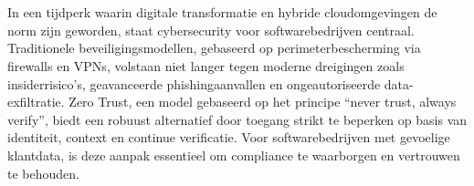
\chapter{}%
\label{ch:inleiding}



In een tijdperk waarin digitale transformatie en hybride cloudomgevingen de norm zijn geworden, staat cybersecurity voor softwarebedrijven centraal. Traditionele beveiligingsmodellen, gebaseerd op perimeterbescherming via firewalls en VPNs, volstaan niet langer tegen moderne dreigingen zoals insiderrisico’s, geavanceerde phishingaanvallen en ongeautoriseerde data-exfiltratie. Zero Trust, een model gebaseerd op het principe “never trust, always verify”, biedt een robuust alternatief door toegang strikt te beperken op basis van identiteit, context en continue verificatie. Voor softwarebedrijven met gevoelige klantdata, is deze aanpak essentieel om compliance te waarborgen en vertrouwen te behouden.

\section{}%
\label{sec:probleemstelling}

